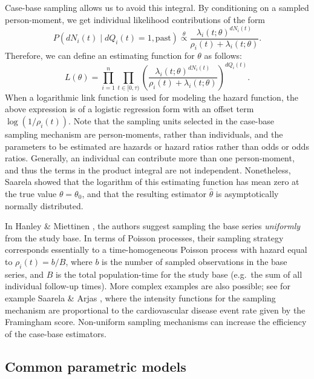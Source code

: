 Case-base sampling allows us to avoid this integral. By conditioning on
a sampled person-moment, we get individual likelihood contributions of
the form
\[P(dN_{i}(t) \mid dQ_{i}(t) = 1,\mathrm{past}) \stackrel{\theta}{\propto} \frac{\lambda_{i}(t; \theta)^{dN_{i}(t)}}{\rho_i(t) + \lambda_{i}(t;\theta)}.\]
Therefore, we can define an estimating function for \(\theta\) as
follows: \begin{equation}
L(\theta) = \prod_{i=1}^{n} \prod_{t\in[0,\tau)} \left(\frac{\lambda_{i}(t; \theta)^{dN_{i}(t)}}{\rho_i(t) + \lambda_{i}(t;\theta)}\right)^{dQ_i(t)}. \label{eq:lik-function}
\end{equation} When a logarithmic link function is used for modeling the
hazard function, the above expression is of a logistic regression form
with an offset term \(\log(1/\rho_i(t))\). Note that the sampling units
selected in the case-base sampling mechanism are person-moments, rather
than individuals, and the parameters to be estimated are hazards or
hazard ratios rather than odds or odds ratios. Generally, an individual
can contribute more than one person-moment, and thus the terms in the
product integral are not independent. Nonetheless, Saarela
\citeyearpar{saarela2016case} showed that the logarithm of this
estimating function has mean zero at the true value \(\theta=\theta_0\),
and that the resulting estimator \(\hat{\theta}\) is asymptotically
normally distributed.

In Hanley \& Miettinen \citeyearpar{hanley2009fitting}, the authors
suggest sampling the base series \emph{uniformly} from the study base.
In terms of Poisson processes, their sampling strategy corresponds
essentially to a time-homogeneous Poisson process with hazard equal to
\(\rho_i(t) = b/B\), where \(b\) is the number of sampled observations
in the base series, and \(B\) is the total population-time for the study
base (e.g.~the sum of all individual follow-up times). More complex
examples are also possible; see for example Saarela \& Arjas
\citeyearpar{saarela2015non}, where the intensity functions for the
sampling mechanism are proportional to the cardiovascular disease event
rate given by the Framingham score. Non-uniform sampling mechanisms can
increase the efficiency of the case-base estimators.

\hypertarget{common-parametric-models}{%
\subsection{Common parametric models}\label{common-parametric-models}}

